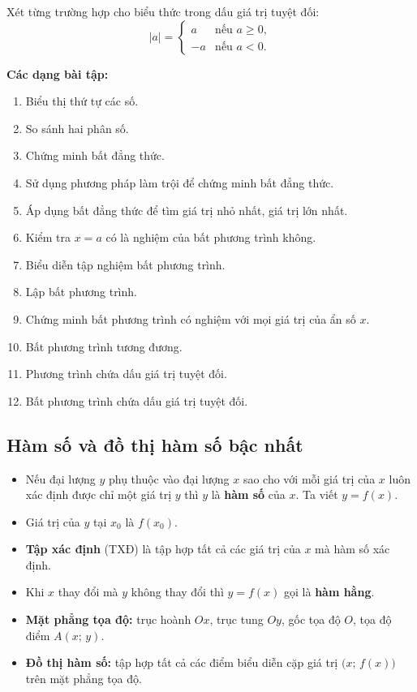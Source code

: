 \documentclass[12pt,a4paper]{article}
\begin{document}
\begin{congthuc}[title={Phương trình và bất phương trình chứa dấu giá trị tuyệt đối}]
  Xét từng trường hợp cho biểu thức trong dấu giá trị tuyệt đối:
  \[
    |a| = \begin{cases} a & \text{nếu } a \ge 0, \\ -a & \text{nếu } a < 0. \end{cases}
  \]
\end{congthuc}

\medskip\noindent\textbf{Các dạng bài tập:}
\begin{enumerate}[label=\textbf{Dạng \arabic*:}, leftmargin=*, align=left]
  \item Biểu thị thứ tự các số.
  \item So sánh hai phân số.
  \item Chứng minh bất đẳng thức.
  \item Sử dụng phương pháp làm trội để chứng minh bất đẳng thức.
  \item Áp dụng bất đẳng thức để tìm giá trị nhỏ nhất, giá trị lớn nhất.
  \item Kiểm tra $x = a$ có là nghiệm của bất phương trình không.
  \item Biểu diễn tập nghiệm bất phương trình.
  \item Lập bất phương trình.
  \item Chứng minh bất phương trình có nghiệm với mọi giá trị của ẩn số $x$.
  \item Bất phương trình tương đương.
  \item Phương trình chứa dấu giá trị tuyệt đối.
  \item Bất phương trình chứa dấu giá trị tuyệt đối.
\end{enumerate}

\subsection{Hàm số và đồ thị hàm số bậc nhất}

\begin{dinhnghia}
  \begin{itemize}
    \item Nếu đại lượng $y$ phụ thuộc vào đại lượng $x$ sao cho với mỗi giá trị của $x$ luôn xác định được chỉ một giá trị $y$ thì $y$ là \textbf{hàm số} của $x$. Ta viết $y = f(x)$.
    \item Giá trị của $y$ tại $x_0$ là $f(x_0)$.
    \item \textbf{Tập xác định} (TXĐ) là tập hợp tất cả các giá trị của $x$ mà hàm số xác định.
    \item Khi $x$ thay đổi mà $y$ không thay đổi thì $y = f(x)$ gọi là \textbf{hàm hằng}.
    \item \textbf{Mặt phẳng tọa độ:} trục hoành $Ox$, trục tung $Oy$, gốc tọa độ $O$, tọa độ điểm $A(x;\, y)$.
    \item \textbf{Đồ thị hàm số:} tập hợp tất cả các điểm biểu diễn cặp giá trị $\bigl(x;\, f(x)\bigr)$ trên mặt phẳng tọa độ.
  \end{itemize}
\end{dinhnghia}
\end{document}
